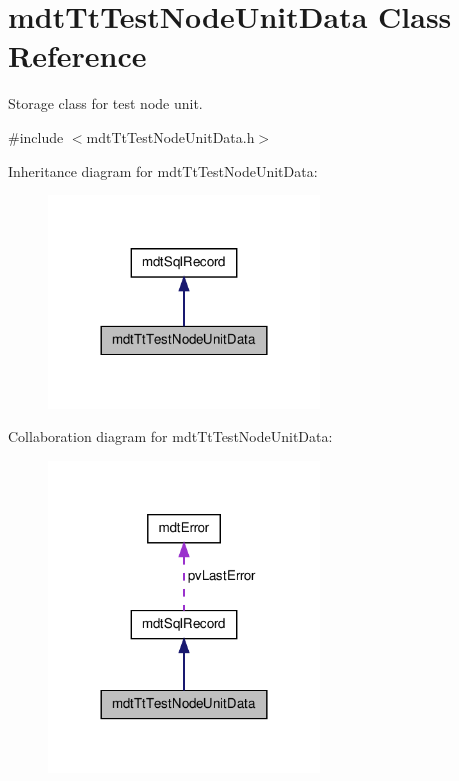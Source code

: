\hypertarget{classmdt_tt_test_node_unit_data}{\section{mdt\-Tt\-Test\-Node\-Unit\-Data Class Reference}
\label{classmdt_tt_test_node_unit_data}
}


Storage class for test node unit.  




{\ttfamily \#include $<$mdt\-Tt\-Test\-Node\-Unit\-Data.\-h$>$}



Inheritance diagram for mdt\-Tt\-Test\-Node\-Unit\-Data\-:
\nopagebreak
\begin{figure}[H]
\begin{center}
\leavevmode
\includegraphics[width=204pt]{classmdt_tt_test_node_unit_data__inherit__graph}
\end{center}
\end{figure}


Collaboration diagram for mdt\-Tt\-Test\-Node\-Unit\-Data\-:
\nopagebreak
\begin{figure}[H]
\begin{center}
\leavevmode
\includegraphics[width=204pt]{classmdt_tt_test_node_unit_data__coll__graph}
\end{center}
\end{figure}
